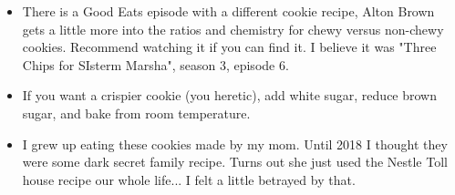 \begin{multicols}{2}
\begin{itemize}
    \item There is a Good Eats episode with a different cookie recipe, Alton Brown gets a little more into the ratios and chemistry for chewy versus non-chewy cookies. Recommend watching it if you can find it. I believe it was "Three Chips for SIsterm Marsha", season 3, episode 6.
    \item If you want a crispier cookie (you heretic), add white sugar, reduce brown sugar, and bake from room temperature.
    \item I grew up eating these cookies made by my mom. Until 2018 I thought they were some dark secret family recipe. Turns out she just used the Nestle Toll house recipe our whole life... I felt a little betrayed by that.
\end{itemize}
\end{multicols}
\clearpage